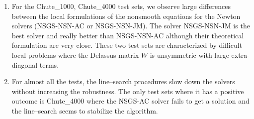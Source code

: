 \begin{enumerate}
\item For the Chute\_1000, Chute\_4000 test sets, we observe large differences between the local formulations of the nonsmooth equations for the Newton solvers ({\sf NSGS-NSN-AC} or {\sf NSGS-NSN-JM}). The solver {\sf NSGS-NSN-JM} is the best solver and really better than {\sf NSGS-NSN-AC} although their theoretical formulation are very close. These two test sets are characterized by difficult local problems where the Delassus matrix  $W$ is unsymmetric with large extra-diagonal terms.
\item For almost all the tests, the line--search procedures slow down the solvers without increasing the robustness. The only test sets where it has a positive outcome is Chute\_4000 where the {\sf NSGS-AC} solver fails to get a solution and the line--search seems to stabilize the algorithm.
\end{enumerate}
